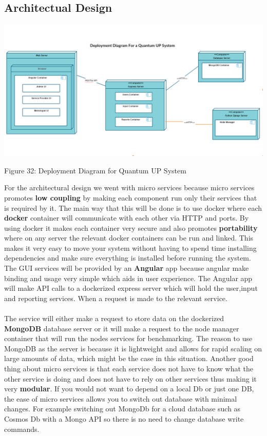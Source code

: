\subsection{Architectual Design}
\includegraphics[width=\textwidth]{deployment_diagram/Quantum_UP_Deployment_Diagram.png}
    \begin{center}
    	\small{Figure 32: Deployment Diagram for Quantum UP System}
    \end{center}

For the architectural design we went with micro services because micro services promotes \textbf{low coupling} by making each component run only their services that is required by it. The main way that this will be done is to use docker where each \textbf{docker} container will communicate with each other via HTTP and ports. By using docker it makes each container very secure and also promotes \textbf{portability} where on any server the relevant docker containers can be run and linked. This makes it very easy to move your system without having to spend time installing dependencies and make sure everything is installed before running the system. The GUI services will be provided by an \textbf{Angular} app because angular make binding and usage very simple which aids in user experience. The Angular app will make API calls to a dockerized express server which will hold the user,input and reporting services. When a request is made to the relevant service.\\ \\ 

The service will either make a request to store data on the dockerized \textbf{MongoDB} database server or it will make a request to the node manager container that will run the nodes services for benchmarking. The reason to use MongoDB as the server is because it is lightweight and allows for rapid scaling on large amounts of data, which might be the case in this situation. Another good thing about micro services is that each service does not have to know what the other service is doing and does not have to rely on other services thus making it very \textbf{modular}. If you would not want to depend on a local Db or just one DB, the ease of micro services allows you to switch out database with minimal changes. For example switching out MongoDb for a cloud database such as Cosmos Db with a Mongo API so there is no need to change database write commands.\\ \\

